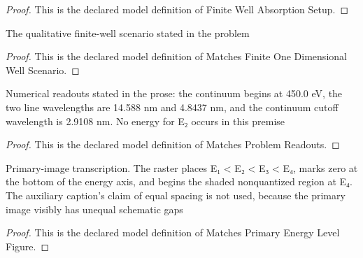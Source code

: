 \begin{proof}
  This is the declared model definition of Finite Well Absorption Setup.
\end{proof}
\begin{definition}
  \label{def:physics:phyx-mini-0586:phyxminiproblems-problemphyxmini0586-matchesfiniteonedimensionalwellscenario}
  The qualitative finite-well scenario stated in the problem
\end{definition}
\begin{proof}
  This is the declared model definition of Matches Finite One Dimensional Well Scenario.
\end{proof}
\begin{definition}
  \label{def:physics:phyx-mini-0586:phyxminiproblems-problemphyxmini0586-matchesproblemreadouts}
  Numerical readouts stated in the prose: the continuum begins at 450.0 eV, the two line wavelengths are 14.588 nm and 4.8437 nm, and the continuum cutoff wavelength is 2.9108 nm. No energy for E₂ occurs in this premise
\end{definition}
\begin{proof}
  This is the declared model definition of Matches Problem Readouts.
\end{proof}
\begin{definition}
  \label{def:physics:phyx-mini-0586:phyxminiproblems-problemphyxmini0586-matchesprimaryenergylevelfigure}
  Primary-image transcription. The raster places E₁ < E₂ < E₃ < E₄, marks zero at the bottom of the energy axis, and begins the shaded nonquantized region at E₄. The auxiliary caption's claim of equal spacing is not used, because the primary image visibly has unequal schematic gaps
\end{definition}
\begin{proof}
  This is the declared model definition of Matches Primary Energy Level Figure.
\end{proof}
